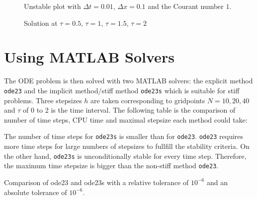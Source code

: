 \documentclass{article}
\begin{document}
\begin{figure}
  \centering
  \caption{Unstable plot with $\Delta t = 0.01$, $\Delta x = 0.1$ and the
    Courant number $1$.}
    \label{unstable_solution}
\end{figure}

\begin{figure}
  \centering
  \caption{Solution at $\tau = 0.5$, $\tau = 1$, $\tau = 1.5$, $\tau = 2$}
    \label{2dplots}
\end{figure}

\section{Using MATLAB Solvers}

The ODE problem is then solved with two MATLAB solvers: the explicit method \texttt{ode23} and the implicit method/stiff method \texttt{ode23s} which is suitable for stiff problems. Three stepsizes $h$ are taken corresponding to gridpoints $N = 10, 20, 40$ and $\tau$ of 0 to 2 is the time interval. The following table is the comparison of number of time steps, CPU time and maximal stepsize each method could take:

The number of time steps for \texttt{ode23s} is smaller than for \texttt{ode23}. \texttt{ode23} requires more time steps for large numbers of stepsizes to fullfill the stability criteria. On the other hand, \texttt{ode23s} is unconditionally stable for every time step. Therefore, the maximum time stepsize is bigger than the non-stiff method \texttt{ode23}.
\begin{table}[!h]
 \caption{Comparison of ode23 and ode23s with a relative tolerance of $10^{-6}$ and an absolute tolerance of $10^{-6}$.}
\end{table}
\end{document}
